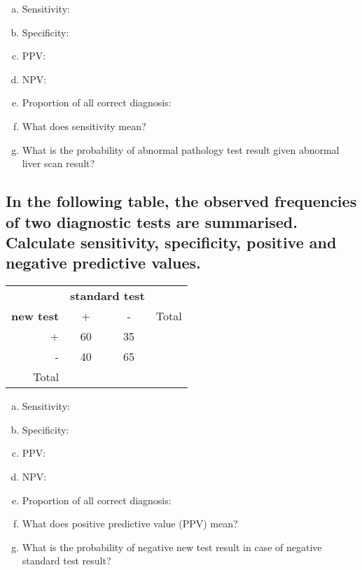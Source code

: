 \begin{enumerate}[a)]
\item Sensitivity: \hrulefill
\item Specificity: \hrulefill
\item PPV:	\hrulefill
\item NPV:	\hrulefill
\item Proportion of all correct diagnosis: \hrulefill
\item What does sensitivity mean? 	\hrulefill
\item What is the probability of abnormal pathology test result given abnormal liver scan result? \hrulefill
\end{enumerate}



\subsection{In the following table, the observed frequencies of two diagnostic tests are summarised. Calculate sensitivity, specificity, positive and negative predictive values.}


\begin{center}
	\begin{tabular}{r|cc|l}
	\toprule
			& \multicolumn{2}{c|}{\textbf{standard test}}\\
	\textbf{new test	}	& +	& -	&Total\\
	\midrule
	+ & 60 & 35\\
	- &	40 & 65\\
	\midrule
	Total	&&	&\\
	\bottomrule	
	\end{tabular}
\end{center}


\begin{enumerate}[a)]
\item Sensitivity: \hrulefill
\item Specificity:	\hrulefill
\item PPV:	\hrulefill
\item NPV:	\hrulefill
\item Proportion of all correct diagnosis: \hrulefill
\item What does positive predictive value (PPV) mean? 	\hrulefill
\item What is the probability of negative new test result in case of negative standard test result? \hrulefill
\end{enumerate}



